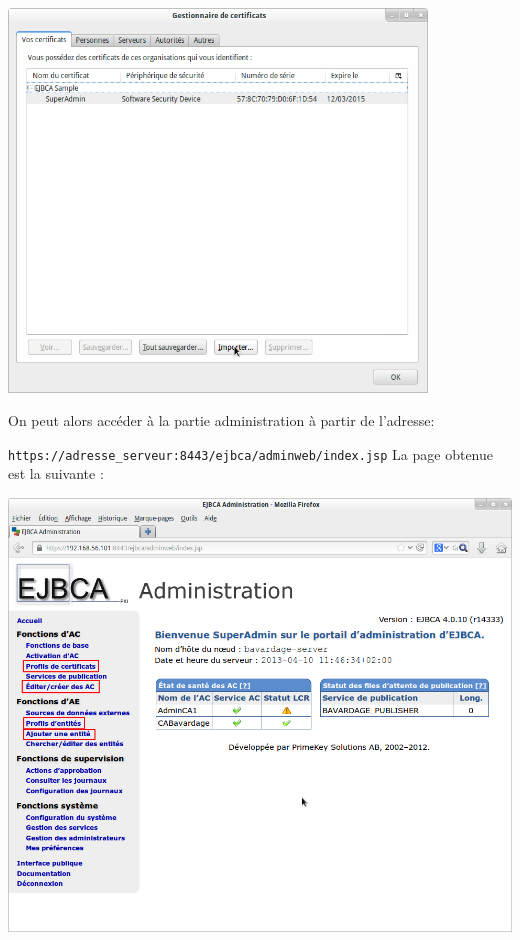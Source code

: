 \documentclass[a4paper,11pt,french]{book}
\begin{document}
\begin{center}
\includegraphics[width=30em]{import_superadmin.png}
\end{center}

On peut alors accéder à la partie administration à partir de l'adresse:

\verb+https://adresse_serveur:8443/ejbca/adminweb/index.jsp+
\newpage
La page obtenue est la suivante :
\begin{center}
\includegraphics[width=40em]{admin_ejbca.png}
\end{center}
\end{document}
